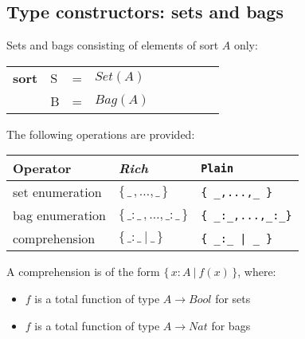 \documentclass{article}
\makeatletter
\newcommand{\frm}[1]{\mbox{\ensuremath{#1}}}
\newcommand{\f}[1]{\ensuremath{\mathit{#1}}}
\newcommand{\fa}[2]{\ensuremath{\f{#1}(#2)}}
\newcommand{\To}{\ensuremath{\rightarrow}}
\newcommand{\set}[1]{\ensuremath{\{\,#1\,\}}}
\newcommand{\bag}[1]{\ensuremath{\set{#1}}}
\newcommand{\scompr}[2]{\ensuremath{\set{#1\ |\ #2}}}
\newcommand{\srtbool}{\f{Bool}}
\newcommand{\srtnat}{\f{Nat}}
\newenvironment{genspect}%
{\par\bigskip\noindent%
 \begin{tabular}{@{}>{\bf}p{2.3em}L@{\ }L@{\ }L@{\ }L@{\ }L@{\ }L@{\ }L@{\ }L}%
}%
{\end{tabular}\bigskip\par%
}
\makeatother
\begin{document}
\begin{slidetop}
\section*{Type constructors: sets and bags}

Sets and bags consisting of elements of sort \frm{A} only:
\begin{genspect}
sort & S & = & \fa{Set}{A}\\
     & B & = & \fa{Bag}{A}
\end{genspect}

The following operations are provided:
\begin{center}
\begin{tabular}{|l@{\qquad}L@{\qquad}l|}
\hline
Operator                       & \textit{Rich}                          & \verb+Plain+\\\hline
set enumeration                & \set{\_\,,\ldots,\_}                   & \verb+{ _,...,_ }+\\
bag enumeration                & \bag{{\_:\_}\,,\ldots,{\_:\_}}         & \verb+{ _:_,...,_:_}+\\
comprehension                  & \scompr{\_:\_}{\_}                     & \verb+{ _:_ | _ }+\\
\hline
\end{tabular}
\end{center}

\bigskip
A comprehension is of the form \frm{\scompr{x{:}A}{\fa{f}{x}}}, where:
\begin{itemize}
\item \frm{f} is a total function of type \frm{A \To \srtbool} for sets
\item \frm{f} is a total function of type \frm{A \To \srtnat} for bags
\end{itemize}
\end{slidetop}
\end{document}
